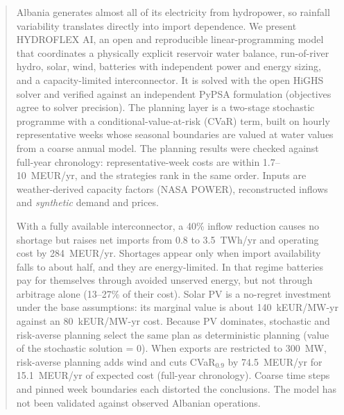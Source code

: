 \begin{abstract}
\noindent Albania generates almost all of its electricity from hydropower, so rainfall variability translates
directly into import dependence. We present HYDROFLEX AI, an open and reproducible linear-programming model
that coordinates a physically explicit reservoir water balance, run-of-river hydro, solar, wind, batteries
with independent power and energy sizing, and a capacity-limited interconnector. It is solved with the open
HiGHS solver and verified against an independent PyPSA formulation (objectives agree to solver precision). The planning layer is a two-stage stochastic programme with a conditional-value-at-risk (CVaR)
term, built on hourly representative weeks whose seasonal boundaries are valued at water values from a coarse
annual model. The planning results were checked against full-year chronology: representative-week costs are
within 1.7--10~MEUR/yr, and the strategies rank in the same order. Inputs are weather-derived capacity
factors (NASA POWER), reconstructed inflows and \emph{synthetic} demand and prices.

\noindent With a fully available interconnector, a 40\% inflow reduction causes no shortage but raises net
imports from 0.8 to 3.5~TWh/yr and operating cost by 284~MEUR/yr. Shortages appear only when import
availability falls to about half, and they are energy-limited. In that regime batteries pay for themselves
through avoided unserved energy, but not through arbitrage alone (13--27\% of their cost). Solar PV is a
no-regret investment under the base assumptions: its marginal value is about 140~kEUR/MW-yr against an
80~kEUR/MW-yr cost. Because PV dominates, stochastic and risk-averse planning select the same plan as
deterministic planning (value of the stochastic solution = 0). When exports are restricted to 300~MW,
risk-averse planning adds wind and cuts CVaR$_{0.9}$ by 74.5~MEUR/yr for 15.1~MEUR/yr of expected cost
(full-year chronology). Coarse time steps and pinned week boundaries each distorted the conclusions. The model
has not been validated against observed Albanian operations.
\end{abstract}
